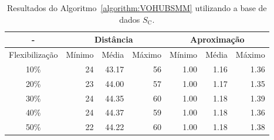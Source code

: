 \begin{table}[!htb]
  \caption{Resultados do Algoritmo~\ref{algorithm:VOHUBSMM} utilizando a base de dados $S_{\text{C}}$.}
  \label{table:DEMGNKRC}
  \centering
  \begin{tabular}{|c|r|r|r|r|r|r|}
    \hline
      -            & \multicolumn{3}{c|}{Distância}             & \multicolumn{3}{c|}{Aproximação}           \\ \hline
    Flexibilização & Mínimo       & Média        & Máximo       & Mínimo       & Média        & Máximo       \\ \hline  
    10\%           & 24           & 43.17        & 56           & 1.00         & 1.16         & 1.36         \\ \hline
    20\%           & 23           & 44.00        & 57           & 1.00         & 1.17         & 1.35         \\ \hline
    30\%           & 24           & 44.35        & 60           & 1.00         & 1.18         & 1.39         \\ \hline
    40\%           & 24           & 44.37        & 59           & 1.00         & 1.18         & 1.36         \\ \hline
    50\%           & 22           & 44.22        & 60           & 1.00         & 1.18         & 1.38         \\ \hline    
  \end{tabular}
\end{table}